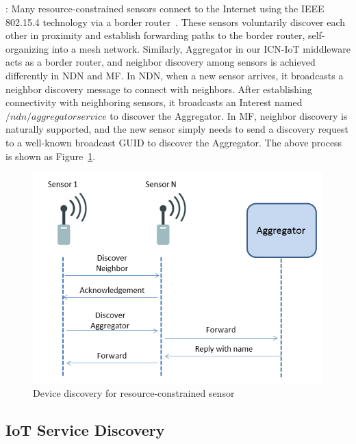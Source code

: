 \vspace{1mm}: Many resource-constrained sensors connect to the Internet using the IEEE 802.15.4 technology via a border router~\cite{hui2008ip}. These sensors voluntarily discover each other in proximity and establish forwarding paths to the border router, self-organizing into a mesh network. Similarly, Aggregator in our ICN-IoT middleware acts as a border router, and neighbor discovery among sensors is achieved differently in NDN and MF. In NDN, when a new sensor arrives, it broadcasts a neighbor discovery message to connect with neighbors. After establishing connectivity with neighboring sensors, it broadcasts an Interest named $/ndn/aggregatorservice$ to discover the Aggregator. In MF, neighbor discovery is naturally supported, and the new sensor simply needs to send a discovery request to a well-known broadcast GUID to discover the Aggregator. %
The above process is shown as Figure~\ref{fig:device_dis}.
\begin{figure}
\includegraphics[width=\columnwidth]{figure/device_discovery.png}
\caption{\label{fig:device_dis}Device discovery for resource-constrained sensor}
\end{figure}



\subsection{IoT Service Discovery}

